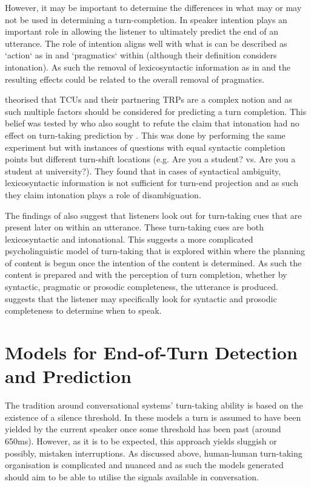\documentclass[logo,bsc,singlespacing,parskip]{infthesis}
\begin{document}
However, it may be important to determine the differences in what may or may not be used in determining a turn-completion. In \cite{PicGar2013} speaker intention plays an important role in allowing the listener to ultimately predict the end of an utterance. The role of intention aligns well with what is can be described as `action` as in \cite{Levinson2012} and `pragmatics` within \cite{Ford1996} (although their definition considers intonation). As such the removal of lexicosyntactic information as in \cite{deRuiter2006} and the resulting effects could be related to the overall removal of pragmatics. 

\cite{Ford1996} theorised that TCUs and their partnering TRPs are a complex notion and as such multiple factors should be considered for predicting a turn completion. This belief was tested by \cite{BogTor2015} who also sought to refute the claim that intonation had no effect on turn-taking prediction by \cite{deRuiter2006}. This was done by performing the same experiment but with instances of questions with equal syntactic completion points but different turn-shift locations (e.g. Are you a student? vs. Are you a student at university?). They found that in cases of syntactical ambiguity, lexicosyntactic information is not sufficient for turn-end projection and as such they claim intonation plays a role of disambiguation.  

The findings of \cite{BogTor2015} also suggest that listeners look out for turn-taking cues that are present later on within an utterance. These turn-taking cues are both lexicosyntactic and intonational. This suggests a more complicated psycholinguistic model of turn-taking that is explored within \cite{LevTor2015} where the planning of content is begun once the intention of the content is determined. As such the content is prepared and with the perception of turn completion, whether by syntactic, pragmatic or prosodic completeness, the utterance is produced. \cite{LevTor2015} suggests that the listener may specifically look for syntactic and prosodic completeness to determine when to speak. 

\section{Models for End-of-Turn Detection and Prediction}
The tradition around conversational systems' turn-taking ability is based on the existence of a silence threshold. In these models a turn is assumed to have been yielded by the current speaker once some threshold has been past (around 650ms). However, as it is to be expected, this approach yields sluggish or possibly, mistaken interruptions. As discussed above, human-human turn-taking organisation is complicated and nuanced and as such the models generated should aim to be able to utilise the signals available in conversation.
\end{document}
